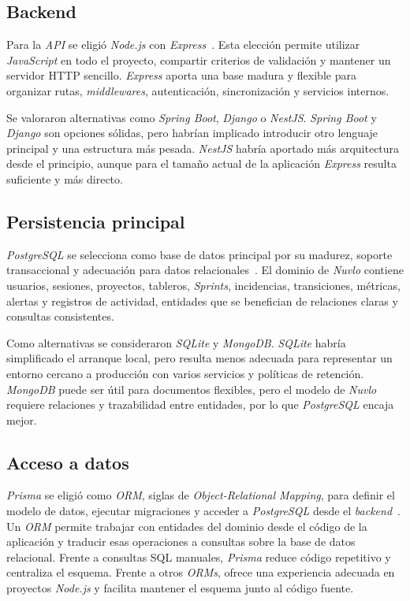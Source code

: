 \subsection{Backend}

Para la \textit{API} se eligió \textit{Node.js} con \textit{Express}~\cite{NodeDocs,ExpressDocs}. Esta elección permite utilizar \textit{JavaScript} en todo el proyecto, compartir criterios de validación y mantener un servidor HTTP sencillo. \textit{Express} aporta una base madura y flexible para organizar rutas, \textit{middlewares}, autenticación, sincronización y servicios internos.

Se valoraron alternativas como \textit{Spring Boot}, \textit{Django} o \textit{NestJS}. \textit{Spring Boot} y \textit{Django} son opciones sólidas, pero habrían implicado introducir otro lenguaje principal y una estructura más pesada. \textit{NestJS} habría aportado más arquitectura desde el principio, aunque para el tamaño actual de la aplicación \textit{Express} resulta suficiente y más directo.

\subsection{Persistencia principal}

\textit{PostgreSQL} se selecciona como base de datos principal por su madurez, soporte transaccional y adecuación para datos relacionales~\cite{PostgreSQLDocs}. El dominio de \textit{Nuvlo} contiene usuarios, sesiones, proyectos, tableros, \textit{Sprints}, incidencias, transiciones, métricas, alertas y registros de actividad, entidades que se benefician de relaciones claras y consultas consistentes.

Como alternativas se consideraron \textit{SQLite} y \textit{MongoDB}. \textit{SQLite} habría simplificado el arranque local, pero resulta menos adecuada para representar un entorno cercano a producción con varios servicios y políticas de retención. \textit{MongoDB} puede ser útil para documentos flexibles, pero el modelo de \textit{Nuvlo} requiere relaciones y trazabilidad entre entidades, por lo que \textit{PostgreSQL} encaja mejor.

\subsection{Acceso a datos}

\textit{Prisma} se eligió como \textit{ORM}, siglas de \textit{Object-Relational Mapping}, para definir el modelo de datos, ejecutar migraciones y acceder a \textit{PostgreSQL} desde el \textit{backend}~\cite{PrismaDocs}. Un \textit{ORM} permite trabajar con entidades del dominio desde el código de la aplicación y traducir esas operaciones a consultas sobre la base de datos relacional. Frente a consultas SQL manuales, \textit{Prisma} reduce código repetitivo y centraliza el esquema. Frente a otros \textit{ORMs}, ofrece una experiencia adecuada en proyectos \textit{Node.js} y facilita mantener el esquema junto al código fuente.

